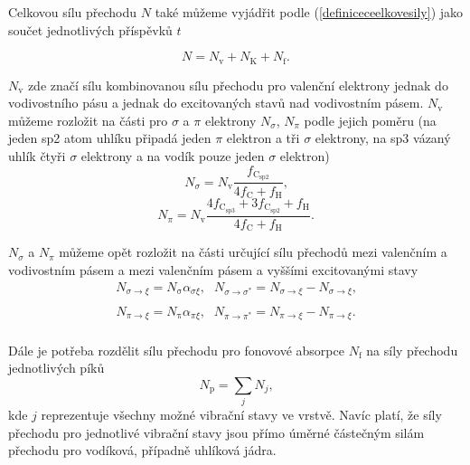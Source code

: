Celkovou sílu přechodu $N$ také můžeme vyjádřit podle (\ref{definiceceelkovesily}) jako součet jednotlivých příspěvků $t$

\begin{equation}
N = N_\mathrm{v} + N_\mathrm{K} + N_\mathrm{f} \text{.}
\end{equation}

$N_\mathrm{v}$ zde značí sílu kombinovanou sílu přechodu pro valenční elektrony jednak do vodivostního pásu a jednak do excitovaných stavů nad vodivostním pásem. $N_\mathrm{v}$ můžeme rozložit na části pro $\sigma$ a $\pi$ elektrony $N_\sigma$, $N_\pi$ podle jejich poměru (na jeden sp2 atom uhlíku připadá jeden $\pi$ elektron a tři $\sigma$ elektrony, na sp3 vázaný uhlík čtyři $\sigma$ elektrony a na vodík pouze jeden $\sigma$  elektron)
\begin{equation}
N_\sigma = N_\mathrm{v} \frac{f_\mathrm{C_{sp2}}}{4f_\mathrm{C} + f_\mathrm{H}}  \text{,}
\end{equation}
\begin{equation}
N_\pi = N_\mathrm{v} \frac{4f_\mathrm{C_{sp3}} + 3f_\mathrm{C_{sp2}} + f_\mathrm{H}}{4f_\mathrm{C} + f_\mathrm{H}}  \text{.}
\end{equation}

$N_\sigma$ a $N_\pi$ můžeme opět rozložit na části určující sílu přechodů mezi valenčním a vodivostním pásem a mezi valenčním pásem a vyššími excitovanými stavy
\begin{equation}
\begin{array}{lr}
N_{\sigma \rightarrow \xi} = N_\mathrm{\sigma} \alpha_{\sigma\xi} \text{,} &
N_{\sigma \rightarrow \sigma^*} = N_{\sigma \rightarrow \xi} - N_{\sigma \rightarrow \xi} \text{,} \\
\end{array}
\end{equation}
\begin{equation}
\begin{array}{lr}
N_{\pi \rightarrow \xi} = N_\mathrm{\pi} \alpha_{\pi\xi} \text{,} &
N_{\pi \rightarrow \pi^*} = N_{\pi \rightarrow \xi} - N_{\pi \rightarrow \xi} \text{.} \\
\end{array}
\end{equation}

Dále je potřeba rozdělit sílu přechodu pro fonovové absorpce $N_\mathrm{f}$ na síly přechodu jednotlivých píků
\begin{equation}
N_\mathrm{p} = \sum_j N_j \text{,}
\end{equation}
kde $j$ reprezentuje všechny možné vibrační stavy ve vrstvě. Navíc platí, že síly přechodu pro jednotlivé vibrační stavy jsou přímo úměrné částečným silám přechodu pro vodíková, případně uhlíková jádra.

